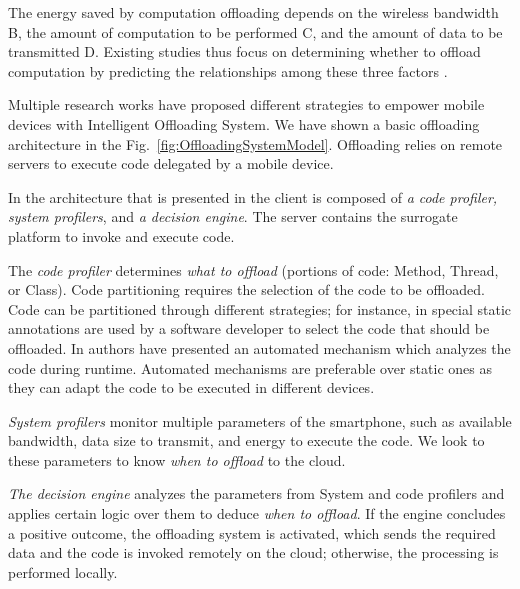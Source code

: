 \documentclass[12pt]{report}
\begin{document}
The energy saved by computation offloading depends on the wireless bandwidth B, the amount of computation to be performed C, and the amount of data to be transmitted D. Existing studies thus focus on determining whether to offload computation by predicting
the relationships among these three factors \cite{kumar2010cloud}.

Multiple research works have proposed different strategies to empower mobile devices with Intelligent Offloading System.
We have shown a basic offloading architecture in the Fig.~\ref{fig:OffloadingSystemModel}. Offloading relies on remote servers to execute code delegated by a mobile device.

In the architecture that is presented in \cite{flores2015mobile} the client is composed of \textit{a code profiler, system profilers}, and \textit{a decision engine}. The server contains the surrogate platform to invoke and execute code.

The \textit{code profiler} determines \textit{what to offload} (portions of code: Method, Thread, or Class). Code partitioning
requires the selection of the code to be offloaded. Code can be partitioned through different strategies; for instance, in \cite{cuervo2010maui} special static annotations are used by a software developer to select the code that should be offloaded. In \cite{chun2011clonecloud} authors have presented an automated mechanism which analyzes the code during runtime. Automated mechanisms are preferable over static ones as they can adapt the code to be executed in different devices.  

\textit{System profilers} monitor multiple parameters of the smartphone, such as available bandwidth, data size to transmit, and
energy to execute the code. We look to these parameters to know \textit{when to offload} to the cloud. 

\textit{The decision engine} analyzes the parameters from System and code profilers and applies certain logic over them to deduce \textit{when to offload}. If the engine concludes a positive outcome, the offloading system is activated, which sends the required data and the code is invoked remotely on the cloud; otherwise, the processing is performed locally.
\end{document}
